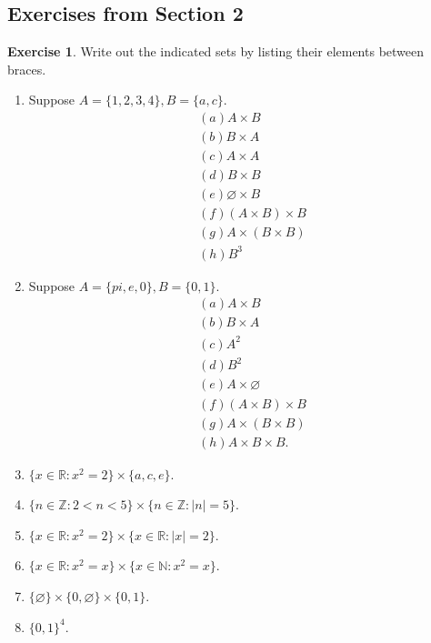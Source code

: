 \documentclass{article}
\theoremstyle{definition}
\newtheorem{exercise}{Exercise}[section]
\newcommand{\R}{\mathbb{R}}
\newcommand{\N}{\mathbb{N}}
\newcommand{\Z}{\mathbb{Z}}
\begin{document}
\subsection{Exercises from Section 2}
\begin{exercise}
    Write out the indicated sets by listing their elements between braces. 
    \begin{enumerate}
        \item Suppose $A=\{ 1,2,3,4 \},B=\{ a,c \}.$ 
        $$
        \begin{aligned}
            &(a) A\times B \\
            &(b) B\times A\\
            &(c) A\times A \\
            &(d) B\times B\\
            &(e) \varnothing \times B \\
            &(f) (A\times B)\times B\\
            &(g) A\times (B\times B)\\
            &(h) B^3
        \end{aligned}
        $$
        \item Suppose $A=\{ pi,e,0 \},B=\{ 0,1 \}.$
        $$
        \begin{aligned}
            &(a) A\times B \\
            &(b) B\times A \\
            &(c) A^2 \\
            &(d) B^2\\
            &(e) A\times\varnothing \\
            &(f) (A\times B)\times B \\
            &(g) A\times(B\times B) \\
            &(h) A\times B\times B.
        \end{aligned}
        $$
        \item 
        $
        \{ x\in\R: x^2=2 \}\times \{ a,c,e \}.
        $
        \item 
        $
        \{ n\in\Z:2<n<5 \}\times \{ n\in\Z:\lvert n \rvert=5 \}.
        $
        \item 
        $
        \{ x\in\R:x^2=2 \}\times \{ x\in\R:\lvert x \rvert=2 \}.
        $
        \item 
        $
        \{ x\in\R:x^2=x \}\times \{ x\in\N:x^2=x \}. 
        $
        \item 
        $
        \{ \varnothing \}\times \{ 0,\varnothing \}\times \{ 0,1 \}.
        $
        \item $\{ 0,1 \}^4.$
    \end{enumerate}
\end{exercise}
\end{document}
